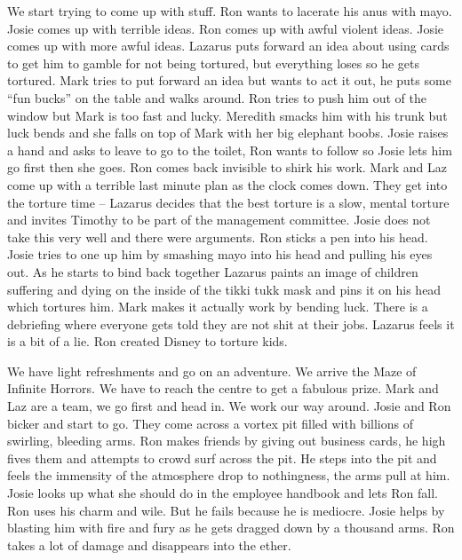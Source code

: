 \begin{multicols}{2}
We start trying to come up with stuff. Ron wants to lacerate his anus with mayo. Josie comes up with terrible ideas. Ron comes up with awful violent ideas. Josie comes up with more awful ideas. Lazarus puts forward an idea about using cards to get him to gamble for not being tortured, but everything loses so he gets tortured. Mark tries to put forward an idea but wants to act it out, he puts some “fun bucks” on the table and walks around. Ron tries to push him out of the window but Mark is too fast and lucky. Meredith smacks him with his trunk but luck bends and she falls on top of Mark with her big elephant boobs. Josie raises a hand and asks to leave to go to the toilet, Ron wants to follow so Josie lets him go first then she goes. Ron comes back invisible to shirk his work. Mark and Laz come up with a terrible last minute plan as the clock comes down. They get into the torture time – Lazarus decides that the best torture is a slow, mental torture and invites Timothy to be part of the management committee. Josie does not take this very well and there were arguments. Ron sticks a pen into his head. Josie tries to one up him by smashing mayo into his head and pulling his eyes out. As he starts to bind back together Lazarus paints an image of children suffering and dying on the inside of the tikki tukk mask and pins it on his head which tortures him. Mark makes it actually work by bending luck. There is a debriefing where everyone gets told they are not shit at their jobs. Lazarus feels it is a bit of a lie. Ron created Disney to torture kids.\medskip

We have light refreshments and go on an adventure. We arrive the Maze of Infinite Horrors. We have to reach the centre to get a fabulous prize. Mark and Laz are a team, we go first and head in. We work our way around. Josie and Ron bicker and start to go. They come across a vortex pit filled with billions of swirling, bleeding arms. Ron makes friends by giving out business cards, he high fives them and attempts to crowd surf across the pit. He steps into the pit and feels the immensity of the atmosphere drop to nothingness, the arms pull at him. Josie looks up what she should do in the employee handbook and lets Ron fall. Ron uses his charm and wile. But he fails because he is mediocre. Josie helps by blasting him with fire and fury as he gets dragged down by a thousand arms. Ron takes a lot of damage and disappears into the ether.\medskip


\end{multicols}
